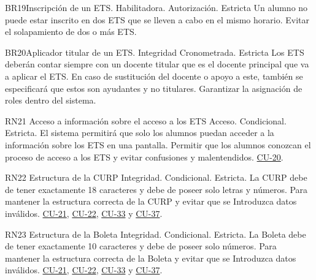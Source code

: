 \begin{BussinesRule}{BR19}{Inscripción de un ETS.} 
    \BRitem[Tipo:] Habilitadora. 
    \BRitem[Clase:] Autorización.
    \BRitem[Nivel:] Estricta
    \BRitem[Descripción:] Un alumno no puede estar inscrito en dos ETS que se lleven a cabo en el mismo horario.
    \BRitem[Motivación:] Evitar el solapamiento de dos o más ETS.
     \hyperlink{}{} 
    \end{BussinesRule}

\begin{BussinesRule}{BR20}{Aplicador titular de un ETS.} 
    \BRitem[Tipo:] Integridad
    \BRitem[Clase:] Cronometrada.
    \BRitem[Nivel:] Estricta
    \BRitem[Descripción:] Los ETS deberán contar siempre con un docente titular que es el docente principal que va a aplicar el ETS. En caso de sustitución del docente o apoyo a este, también se especificará que estos son ayudantes y no titulares.
    \BRitem[Motivación:] Garantizar la asignación de roles dentro del sistema.
     \hyperlink{}{} 
    \end{BussinesRule}

%
\begin{BussinesRule}{RN21} {Acceso a información sobre el acceso a los ETS}
    \BRitem[Tipo:] Acceso.
    \BRitem[Clase:]Condicional.
    \BRitem[Nivel:] Estricta.
    \BRitem[Descripción:] El sistema permitirá que solo los alumnos puedan acceder a la información sobre los ETS en una pantalla.
    \BRitem[Motivación:] Permitir que los alumnos conozcan el proceso de acceso a los ETS y evitar confusiones y malentendidos.
     \hyperlink{CU-20}{CU-20}.
    \end{BussinesRule}

\begin{BussinesRule}{RN22} {Estructura de la CURP}
    \BRitem[Tipo:]Integridad.
    \BRitem[Clase:]Condicional.
    \BRitem[Nivel:] Estricta.
    \BRitem[Descripción:] La CURP debe de tener exactamente 18 caracteres y debe de poseer solo letras y números.
    \BRitem[Motivación:] Para mantener la estructura correcta de la CURP y evitar que se Introduzca datos inválidos.
     \hyperlink{CU-21}{CU-21}, \hyperlink{CU-22}{CU-22}, \hyperlink{CU-33}{CU-33} y \hyperlink{CU-37}{CU-37}.
    \end{BussinesRule}

\begin{BussinesRule}{RN23} {Estructura de la Boleta}
    \BRitem[Tipo:]Integridad.
    \BRitem[Clase:]Condicional.
    \BRitem[Nivel:] Estricta.
    \BRitem[Descripción:] La Boleta debe de tener exactamente 10 caracteres y debe de poseer solo números.
    \BRitem[Motivación:] Para mantener la estructura correcta de la Boleta y evitar que se Introduzca datos inválidos.
     \hyperlink{CU-21}{CU-21}, \hyperlink{CU-22}{CU-22}, \hyperlink{CU-33}{CU-33} y \hyperlink{CU-37}{CU-37}.
    \end{BussinesRule}

